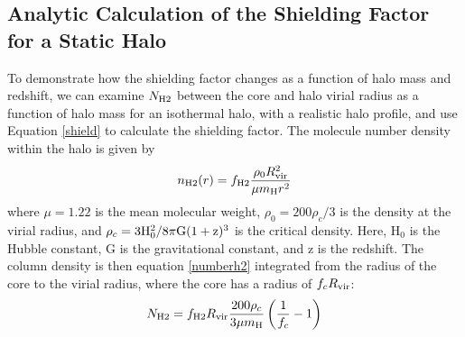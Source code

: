 \documentclass[fleqn,usenatbib]{mnras}
\begin{document}
\subsection{Analytic Calculation of the Shielding Factor for a Static Halo}
To demonstrate how the shielding factor changes as a function of halo mass and redshift, we can examine $N_{\rm H2}$ between the core and halo virial radius as a function of halo mass for an isothermal halo, with a realistic \hh{} halo profile, and use Equation \ref{shield} to calculate the shielding factor. The \hh{} molecule number density within the halo is given by 
\begin{equation} \label{numberh2}
	n_{\rm H2}(r) = f_{\rm H2} \frac{\rho_{0}R^{2}_{\rm vir}}{\mu m_{\rm H} r^{2}}
\end{equation}
where $\mu = 1.22$ is the mean molecular weight, $\rho_{0} = 200 \rho_{c} / 3$ is the density at the virial radius, and $\rho_{c} = 3 \rm H_{0}^{2} / 8 \pi G (1+z)^3$ is the critical density. Here, H$_{0}$ is the Hubble constant, G is the gravitational constant, and z is the redshift. The column density is then equation \ref{numberh2} integrated from the radius of the core to the virial radius, where the core has a radius of $f_{c} R_{\rm vir}$: 
\begin{equation} \label{columnh2}
	N_{\rm H2} = f_{\rm H2} R_{\rm vir} \frac{200 \rho_{c}}{3 \mu m_{\rm H}} \left(\frac{1}{f_{c}} - 1 \right)
\end{equation}
\end{document}
